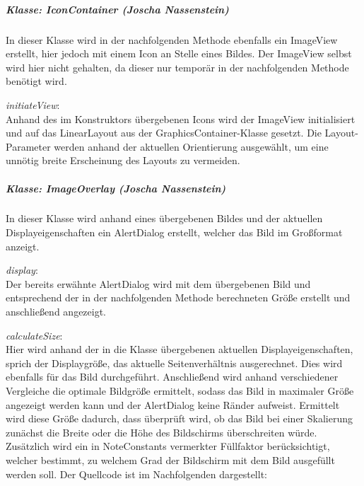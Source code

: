 \subparagraph*{Klasse: IconContainer (Joscha Nassenstein)}
In dieser Klasse wird in der nachfolgenden Methode ebenfalls ein ImageView erstellt, hier jedoch mit einem Icon an Stelle eines Bildes. Der ImageView selbst wird hier nicht gehalten, da dieser nur temporär in der nachfolgenden Methode benötigt wird.

\textit{initiateView}:\\
Anhand des im Konstruktors übergebenen Icons wird der ImageView initialisiert und auf das LinearLayout aus der GraphicsContainer-Klasse gesetzt. Die Layout-Parameter werden anhand der aktuellen Orientierung ausgewählt, um eine unnötig breite Erscheinung des Layouts zu vermeiden.

\subparagraph*{Klasse: ImageOverlay (Joscha Nassenstein)}
In dieser Klasse wird anhand eines übergebenen Bildes und der aktuellen Displayeigenschaften ein AlertDialog erstellt, welcher das Bild im Großformat anzeigt.

\textit{display}:\\
Der bereits erwähnte AlertDialog wird mit dem übergebenen Bild und entsprechend der in der nachfolgenden Methode berechneten Größe erstellt und anschließend angezeigt.

\textit{calculateSize}:\\
Hier wird anhand der in die Klasse übergebenen aktuellen Displayeigenschaften, sprich der Displaygröße, das aktuelle Seitenverhältnis ausgerechnet. Dies wird ebenfalls für das Bild durchgeführt. Anschließend wird anhand verschiedener Vergleiche die optimale Bildgröße ermittelt, sodass das Bild in maximaler Größe angezeigt werden kann und der AlertDialog keine Ränder aufweist. Ermittelt wird diese Größe dadurch, dass überprüft wird, ob das Bild bei einer Skalierung zunächst die Breite oder die Höhe des Bildschirms überschreiten würde. Zusätzlich wird ein in NoteConstants vermerkter Füllfaktor berücksichtigt, welcher bestimmt, zu welchem Grad der Bildschirm mit dem Bild ausgefüllt werden soll.
Der Quellcode ist im Nachfolgenden dargestellt: 


